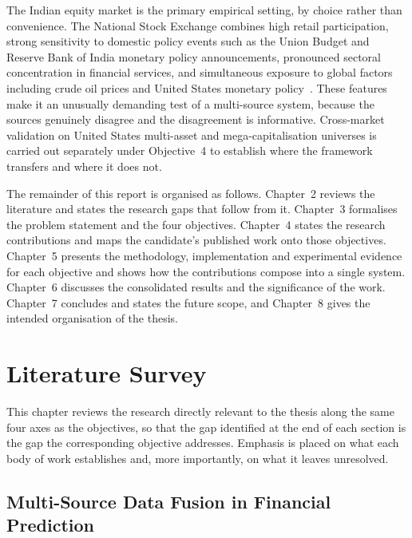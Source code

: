 The Indian equity market is the primary empirical setting, by choice rather than
convenience. The National Stock Exchange combines high retail participation, strong
sensitivity to domestic policy events such as the Union Budget and Reserve Bank of India
monetary policy announcements, pronounced sectoral concentration in financial services, and
simultaneous exposure to global factors including crude oil prices and United States
monetary policy~\cite{mu2023investor,bacco2024,khan2025asymmetric}. These features make it
an unusually demanding test of a multi-source system, because the sources genuinely disagree
and the disagreement is informative. Cross-market validation on United States multi-asset
and mega-capitalisation universes is carried out separately under Objective~4 to establish
where the framework transfers and where it does not.

The remainder of this report is organised as follows. Chapter~2 reviews the literature and
states the research gaps that follow from it. Chapter~3 formalises the problem statement and
the four objectives. Chapter~4 states the research contributions and maps the candidate's
published work onto those objectives. Chapter~5 presents the methodology, implementation and
experimental evidence for each objective and shows how the contributions compose into a
single system. Chapter~6 discusses the consolidated results and the significance of the
work. Chapter~7 concludes and states the future scope, and Chapter~8 gives the intended
organisation of the thesis.

\chapter{Literature Survey}

This chapter reviews the research directly relevant to the thesis along the same four axes
as the objectives, so that the gap identified at the end of each section is the gap the
corresponding objective addresses. Emphasis is placed on what each body of work establishes
and, more importantly, on what it leaves unresolved.

\section{Multi-Source Data Fusion in Financial Prediction}

